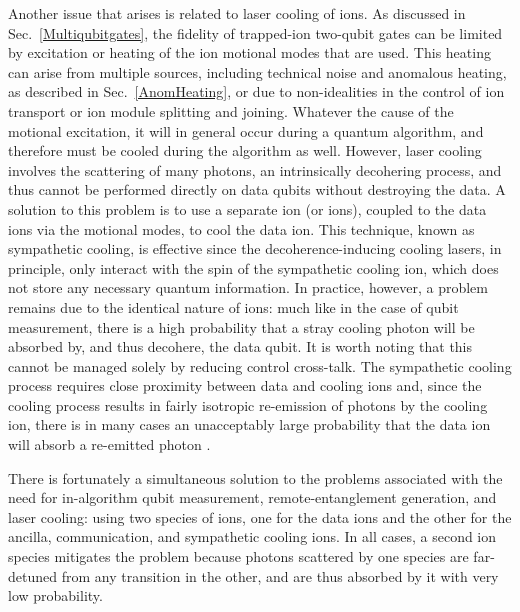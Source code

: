\documentclass[%
reprint,
 amsmath,amssymb,
]{revtex4-1}
\begin{document}
Another issue that arises is related to laser cooling of ions. As discussed in Sec.~\ref{Multiqubitgates}, the fidelity of trapped-ion two-qubit gates can be limited by excitation or heating of the ion motional modes that are used.  This heating can arise from multiple sources, including technical noise and anomalous heating, as described in Sec.~\ref{AnomHeating}, or due to non-idealities in the control of ion transport or ion module splitting and joining.  Whatever the cause of the motional excitation, it will in general occur during a quantum algorithm, and therefore must be cooled during the algorithm as well.  However, laser cooling involves the scattering of many photons, an intrinsically decohering process, and thus cannot be performed directly on data qubits without destroying the data.  A solution to this problem is to use a separate ion (or ions), coupled to the data ions via the motional modes, to cool the data ion.  This technique, known as sympathetic cooling, is effective since the decoherence-inducing cooling lasers, in principle, only interact with the spin of the sympathetic cooling ion, which does not store any necessary quantum information.  In practice, however, a problem remains due to the identical nature of ions: much like in the case of qubit measurement, there is a high probability that a stray cooling photon will be absorbed by, and thus decohere, the data qubit.  It is worth noting that this cannot be managed solely by reducing control cross-talk.  The sympathetic cooling process requires close proximity between data and cooling ions and, since the cooling process results in fairly isotropic re-emission of photons by the cooling ion, there is in many cases an unacceptably large probability that the data ion will absorb a re-emitted photon \cite{BruzewiczQLAR2017}.

There is fortunately a simultaneous solution to the problems associated with the need for in-algorithm qubit measurement, remote-entanglement generation, and laser cooling: using two species of ions, one for the data ions and the other for the ancilla, communication, and sympathetic cooling ions.  In all cases, a second ion species mitigates the problem because photons scattered by one species are far-detuned from any transition in the other, and are thus absorbed by it with very low probability.
\end{document}
